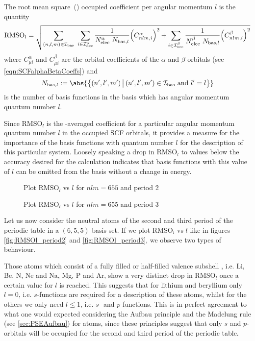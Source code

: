 \defineabbr{RMS}{RMS\xspace}{root mean square}
\newcommand{\RMSOl}{\text{RMSO}_l}
\begin{defn}
	The root mean square~(\RMS) occupied coefficient per angular momentum $l$
	is the quantity
	\begin{equation}
	\RMSOl =
		\sqrt{
		\sum_{(n,l,m) \in \Ibas} \
		\sum_{i \in \IoccA} \frac{1}{\NelecA \ N_{\text{bas}, l}}
			\Big(C^\alpha_{nlm, i} \Big)^2
			+ \sum_{i \in \IoccB} \frac{1}{\NelecB \ N_{\text{bas}, l}}
			\Big( C^\beta_{nlm, i} \Big)^2
		}
		\label{eqn:DefRMSOl}
	\end{equation}
	where $C^\alpha_{\mu i}$ and $C^\beta_{\mu i}$
	are the orbital coefficients of the $\alpha$ and $\beta$ orbitals
	(see \eqref{eqn:SCFalphaBetaCoeffs})
	and
	\[
		N_{\text{bas}, l} := \abs{ \left\{ (n',l',m') \, \big|\, (n',l',m') \in \Ibas
			\ \text{and} \ l' = l \right\} }
	\]
	is the number of basis functions in the \CS basis which has angular momentum
	quantum number $l$.
\end{defn}
Since $\RMSOl$ is the \RMS-averaged coefficient for a particular angular
momentum quantum number $l$ in the occupied SCF orbitals,
it provides a measure for the importance of the \CS basis functions
with quantum number $l$ for the description of this particular system.
Loosely speaking a drop in $\RMSOl$ to values below the
accuracy desired for the calculation indicates that basis functions with
this value of $l$ can be omitted from the basis without a change in \HF energy.

\begin{figure}
	\centering
	\caption{Plot $\RMSOl$ vs $l$ for $nlm = 655$ and period 2}
	\label{fig:RMSOl_period2}
\end{figure}

\begin{figure}
	\centering
	\caption{Plot $\RMSOl$ vs $l$ for $nlm = 655$ and period 3}
	\label{fig:RMSOl_period3}
\end{figure}
Let us now consider the neutral atoms of the second and third period of
the periodic table in a $(6,5,5)$ \CS basis set.
If we plot $\RMSOl$ vs $l$ like in figures \vref{fig:RMSOl_period2}
and \vref{fig:RMSOl_period3}, we observe two types of behaviour.

Those atoms which consist of a fully filled or half-filled valence subshell
, i.e. Li, Be, N, Ne and Na, Mg, P and Ar,
show a very distinct drop in $\RMSOl$ once a certain value
for $l$ is reached.
This suggests that for lithium and beryllium only $l=0$,
i.e. $s$-functions are required for a description of these atoms,
whilst for the others we only need $l \leq 1$, i.e. $s$- and $p$-functions.
This is in perfect agreement to what one would expected
considering the Aufbau principle and the Madelung rule (see \vref{sec:PSEAufbau})
for atoms,
since these principles suggest that only $s$ and $p$-orbitals will be
occupied for the second and third period of the periodic table.

